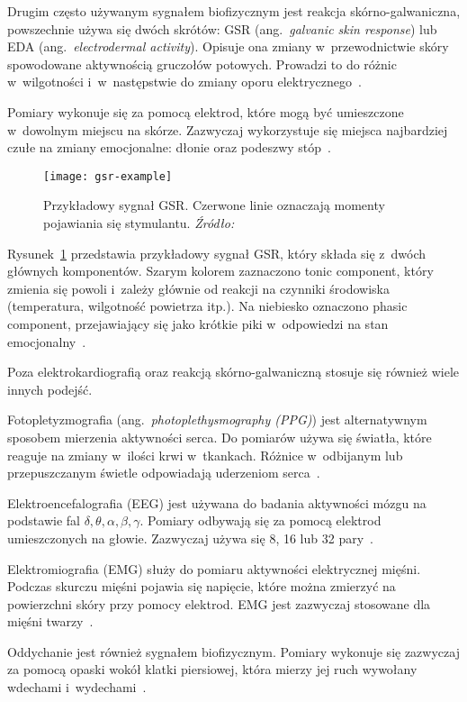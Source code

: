 Drugim często używanym sygnałem biofizycznym jest reakcja skórno-galwaniczna, powszechnie używa się dwóch skrótów: GSR (ang.~\textit{galvanic skin response}) lub EDA (ang.~\textit{electrodermal activity}).
Opisuje ona zmiany w~przewodnictwie skóry spowodowane aktywnością gruczołów potowych.
Prowadzi to do różnic w~wilgotności i~w~następstwie do zmiany oporu elektrycznego~\cite{Dzedzickis2020}.

Pomiary wykonuje się za pomocą elektrod, które mogą być umieszczone w~dowolnym miejscu na skórze.
Zazwyczaj wykorzystuje się miejsca najbardziej czułe na zmiany emocjonalne: dłonie oraz podeszwy stóp~\cite{Calvo2015}.

\begin{figure}[h]
    \centering
    \texttt{[image: gsr-example]}
    \caption{Przykładowy sygnał GSR. Czerwone linie oznaczają momenty pojawiania się stymulantu. \textit{Źródło:~\cite{Dzedzickis2020}}}
    \label{fig:gsr-example}
\end{figure}

Rysunek~\ref{fig:gsr-example} przedstawia przykładowy sygnał GSR, który składa się z~dwóch głównych komponentów.
Szarym kolorem zaznaczono tonic component, który zmienia się powoli i~zależy głównie od reakcji na czynniki środowiska (temperatura, wilgotność powietrza itp.).
Na niebiesko oznaczono phasic component, przejawiający się jako krótkie piki w~odpowiedzi na stan emocjonalny~\cite{Dzedzickis2020}.

Poza elektrokardiografią oraz reakcją skórno-galwaniczną stosuje się również wiele innych podejść.

Fotopletyzmografia (ang.~\textit{photoplethysmography (PPG)}) jest alternatywnym sposobem mierzenia aktywności serca.
Do pomiarów używa się światła, które reaguje na zmiany w~ilości krwi w~tkankach.
Różnice w~odbijanym lub przepuszczanym świetle odpowiadają uderzeniom serca~\cite{Dzedzickis2020}.

Elektroencefalografia (EEG) jest używana do badania aktywności mózgu na podstawie fal \(\delta, \theta, \alpha, \beta, \gamma\).
Pomiary odbywają się za pomocą elektrod umieszczonych na głowie.
Zazwyczaj używa się 8, 16 lub 32 pary~\cite{Dzedzickis2020}.

Elektromiografia (EMG) służy do pomiaru aktywności elektrycznej mięśni.
Podczas skurczu mięśni pojawia się napięcie, które można zmierzyć na powierzchni skóry przy pomocy elektrod.
EMG jest zazwyczaj stosowane dla mięśni twarzy~\cite{Dzedzickis2020}.

Oddychanie jest również sygnałem biofizycznym.
Pomiary wykonuje się zazwyczaj za pomocą opaski wokół klatki piersiowej, która mierzy jej ruch wywołany wdechami i~wydechami~\cite{Dzedzickis2020}.


